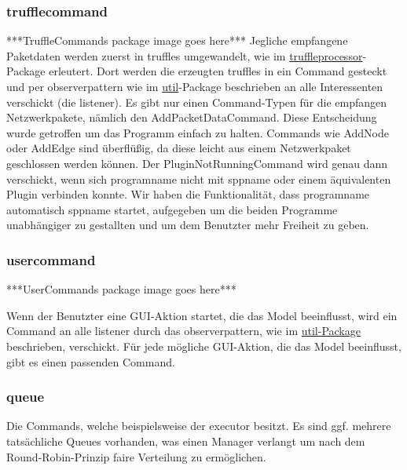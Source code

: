       \subsubsection{trufflecommand}
      \label{subsubsec:trufflecommand}
      ***TruffleCommands package image goes here***
      \newline
      \newline
      Jegliche empfangene Paketdaten werden zuerst in \glspl{truffle} umgewandelt, wie
      im \hyperref[subsubsec:truffleprocessor]{truffleprocessor}-Package erleutert. Dort
      werden die erzeugten \glspl{truffle} in ein Command gesteckt und per \gls{observerpattern}
      wie im \hyperref[subsec:util]{util}-Package beschrieben an alle Interessenten verschickt
      (die \gls{listener}).
      \newline
      \newline
      Es gibt nur einen Command-Typen für die empfangen Netzwerkpakete, nämlich den
      AddPacketDataCommand. Diese Entscheidung wurde getroffen um das Programm einfach
      zu halten. Commands wie AddNode oder AddEdge sind überflüßig, da diese leicht aus
      einem Netzwerkpaket geschlossen werden können.
      \newline
      \newline
      Der PluginNotRunningCommand wird genau dann verschickt, wenn sich \gls{programname}
      nicht mit \gls{sppname} oder einem äquivalenten Plugin verbinden konnte. Wir
      haben die Funktionalität, dass \gls{programname} automatisch \gls{sppname} startet,
      aufgegeben um die beiden Programme unabhängiger zu gestallten und um dem Benutzter
      mehr Freiheit zu geben.

      \subsubsection{usercommand}
      \label{subsubsec:usercommand}
      ***UserCommands package image goes here***
      \newline
      \newline

      Wenn der Benutzter eine GUI-Aktion startet, die das Model beeinflusst,
      wird ein Command an alle \gls{listener} durch das \gls{observerpattern}, wie im
      \hyperref[subsec:util]{util-Package} beschrieben, verschickt. Für jede mögliche
      GUI-Aktion, die das Model beeinflusst, gibt es einen passenden Command.

      \subsubsection{queue}
      \label{subsubsec:queue}
      Die Commands, welche beispielsweise der executor besitzt. Es
      sind ggf. mehrere tatsächliche Queues vorhanden, was einen Manager verlangt
      um nach dem Round-Robin-Prinzip faire Verteilung zu ermöglichen.

